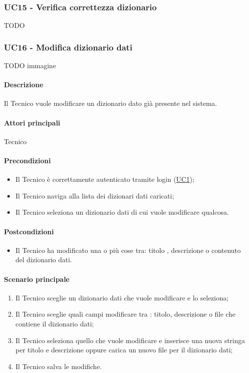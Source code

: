 \subsubsection{UC15 - Verifica correttezza dizionario}\label{UC15}
TODO


\subsubsection{UC16 - Modifica dizionario dati}\label{UC16}
TODO immagine
\paragraph*{Descrizione} Il Tecnico vuole modificare un dizionario dato già presente nel sistema.

\paragraph*{Attori principali} Tecnico

\paragraph*{Precondizioni}
\begin{itemize}
  \item Il Tecnico è correttamente autenticato tramite login (\hyperref[UC1]{UC1});
  \item Il Tecnico naviga alla lista dei dizionari dati caricati;
  \item Il Tecnico seleziona un dizionario dati di cui vuole modificare qualcosa.  
\end{itemize}

\paragraph*{Postcondizioni}
\begin{itemize}
  \item Il Tecnico ha modificato una o più cose tra: titolo , descrizione o contenuto del dizionario dati.
\end{itemize}

\paragraph*{Scenario principale}
\begin{enumerate}
  \item Il Tecnico sceglie un dizionario dati che vuole modificare e lo seleziona;
  \item Il Tecnico sceglie quali campi modificare tra : titolo, descrizione o file che contiene il dizionario dati;
  \item Il Tecnico seleziona quello che vuole modificare e inserisce una nuova stringa per titolo e descrizione oppure carica un nuovo file per il dizionario dati;
  \item Il Tecnico salva le modifiche.  
\end{enumerate}

